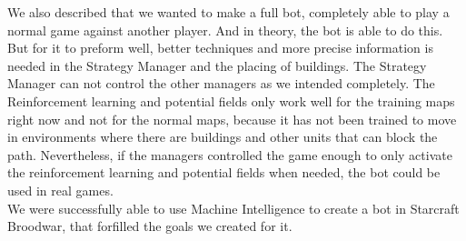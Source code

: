 We also described that we wanted to make a full bot, completely able to play a normal game against another player. And in theory, the bot is able to do this. But for it to preform well, better techniques and more precise information is needed in the Strategy Manager and the placing of buildings. The Strategy Manager can not control the other managers as we intended completely. The Reinforcement learning and potential fields only work well for the training maps right now and not for the normal maps, because it has not been trained to move in environments where there are buildings and other units that can block the path. Nevertheless, if the managers controlled the game enough to only activate the reinforcement learning and potential fields when needed, the bot could be used in real games.\\

We were successfully able to use Machine Intelligence to create a bot in Starcraft Broodwar, that forfilled the goals we created for it.


